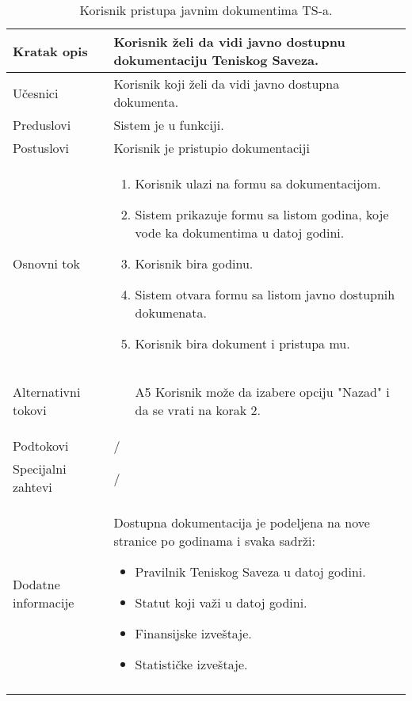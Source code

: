 \documentclass{article}
\begin{document}
        \begin{longtable}{| p{} | p{} |} 
            \hline
                Kratak opis & Korisnik želi da vidi javno dostupnu dokumentaciju Teniskog Saveza.\\
            \hline    
                Učesnici & Korisnik koji želi da vidi javno dostupna dokumenta. \\
            \hline
               Preduslovi &  Sistem je u funkciji.\\
            \hline  
                Postuslovi &  Korisnik je pristupio dokumentaciji\\
            \hline
                Osnovni tok & \begin{enumerate}
                    \item Korisnik ulazi na formu sa dokumentacijom.
                    \item Sistem prikazuje formu sa listom godina, koje vode ka dokumentima u datoj godini.
                    \item Korisnik bira godinu.
                    \item Sistem otvara formu sa listom javno dostupnih dokumenata.
                    \item Korisnik bira dokument i pristupa mu.
                \end{enumerate}\\
            \hline
                Alternativni tokovi & \begin{itemize}
                    \item [A5] Korisnik može da izabere opciju "Nazad" i da se vrati na korak 2.
                \end{itemize}\\
            \hline
                Podtokovi & /\\
            \hline
                Specijalni zahtevi & /\\
            \hline
                Dodatne informacije & Dostupna dokumentacija je podeljena na nove stranice po godinama i svaka sadrži:
                \begin{itemize}
                    \item Pravilnik Teniskog Saveza u datoj godini.
                    \item Statut koji važi u datoj godini.
                    \item Finansijske izveštaje.
                    \item Statističke izveštaje.
                \end{itemize}\\
            \hline
            \caption{Korisnik pristupa javnim dokumentima TS-a.} 
        \end{longtable}
\end{document}
